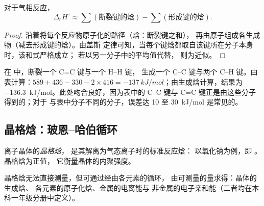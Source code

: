 \begin{proposition}[由键焓估算]\label{prop:b2:reaction-enthalpy:bond-estimate}
对于气相反应，
\[
  \Delta_r H^\circ \approx \sum(\text{断裂键的焓}) -
  \sum(\text{形成键的焓}).
\]
\end{proposition}

\begin{proof}
沿着将每个反应物原子化的路径（焓：断裂键之和），
再由原子组成各生成物（减去形成键的焓）。由盖斯
定律可知，当每个键焓都取自该键所在分子本身时，该和式严格成立；
若以另一分子中的平均值代替，
则为近似。
\end{proof}

\begin{example}[乙烯加氢]\label{ex:b2:reaction-enthalpy:hydrogenation}
在  中，断裂一个 C=C 键与一个 H--H 键，
生成一个 C--C 键与两个 C--H 键。由表计算：$589 + 436 - 330 - 2
\times 416 = \qty{-137}{kJ/mol}$；由生成焓计算，结果为
\qty{-136.3}{kJ/mol}。此处吻合良好，因为表中的 C--C
键与 C=C 键正是由这些分子得到的；对于
与表中分子不同的分子，误差达 10 至 \qty{30}{kJ/mol} 是常见的。
\end{example}

\subsection*{晶格焓：玻恩–哈伯循环}

\begin{definition}[晶格焓]\label{def:b2:reaction-enthalpy:lattice-enthalpy}
离子晶体的\emph{晶格焓}，
是其解离为气态离子时的标准反应焓：
以氯化钠为例，即 。晶格焓为正值，
它衡量晶体的内聚强度。
\end{definition}

晶格焓无法直接测量，但可通过经由各元素的循环，
由可测量的量求得：晶体的生成焓、
各元素的原子化焓、金属的电离能与
非金属的电子亲和能（二者均在本科一年级分册中定义）。

